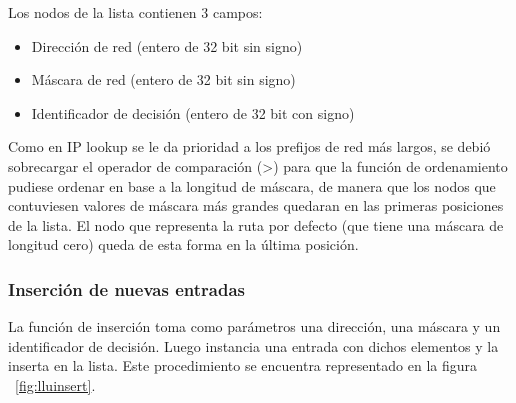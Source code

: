 Los nodos de la lista contienen 3 campos:

\begin{itemize}
	\item Dirección de red (entero de 32 bit sin signo)
	\item Máscara de red (entero de 32 bit sin signo)
	\item Identificador de decisión (entero de 32 bit con signo)
\end{itemize}

Como en IP lookup se le da prioridad a los prefijos de red más largos, se debió sobrecargar el operador de comparación (\textgreater) para que la función de ordenamiento pudiese ordenar en base a la longitud de máscara, de manera que los nodos que contuviesen valores de máscara más grandes quedaran en las primeras posiciones de la lista. El nodo que representa la ruta por defecto (que tiene una máscara de longitud cero) queda de esta forma en la última posición.

\subsubsection{Inserción de nuevas entradas}

La función de inserción toma como parámetros una dirección, una máscara y un identificador de decisión. Luego instancia una entrada con dichos elementos y la inserta en la lista. Este procedimiento se encuentra representado en la figura ~\ref{fig:lluinsert}.


